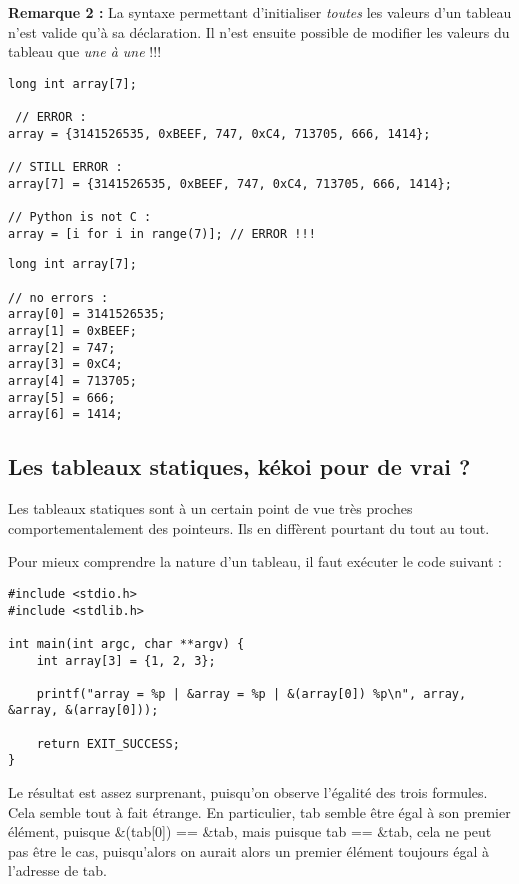 \documentclass[../../../main.tex]{subfiles}
\begin{document}
\textbf{Remarque 2 :} La syntaxe permettant d'initialiser \textit{toutes} les valeurs d'un tableau n'est valide qu'à sa déclaration. Il n'est ensuite possible de modifier les valeurs du tableau que \textit{une à une} !!!  

\begin{minipage}{0.75\textwidth}
\begin{verbatim}
long int array[7];

 // ERROR :
array = {3141526535, 0xBEEF, 747, 0xC4, 713705, 666, 1414};

// STILL ERROR :
array[7] = {3141526535, 0xBEEF, 747, 0xC4, 713705, 666, 1414}; 

// Python is not C :
array = [i for i in range(7)]; // ERROR !!!
\end{verbatim}
\end{minipage}
\begin{minipage}{0.25\textwidth}
\begin{verbatim}
long int array[7];

// no errors :
array[0] = 3141526535;
array[1] = 0xBEEF;
array[2] = 747;
array[3] = 0xC4;
array[4] = 713705;
array[5] = 666;
array[6] = 1414;
\end{verbatim}
\end{minipage}
\subsection{Les tableaux statiques, kékoi pour de vrai ?}
Les tableaux statiques sont à un certain point de vue très proches comportementalement des pointeurs. Ils en diffèrent pourtant du tout au tout.
 
Pour mieux comprendre la nature d'un tableau, il faut exécuter le code suivant :
\begin{verbatim}
#include <stdio.h>
#include <stdlib.h>

int main(int argc, char **argv) {
	int array[3] = {1, 2, 3};

	printf("array = %p | &array = %p | &(array[0]) %p\n", array, &array, &(array[0]));

	return EXIT_SUCCESS;
}
\end{verbatim}
Le résultat est assez surprenant, puisqu'on observe l'égalité des trois formules. Cela semble tout à fait étrange. En particulier, \textsf{tab} semble être égal à son premier élément, puisque \textsf{\&(tab[0]) == \&tab}, mais puisque \textsf{tab == \&tab}, cela ne peut pas être le cas, puisqu'alors on aurait alors un premier élément toujours égal à l'adresse de \textsf{tab}.
 
\end{document}
